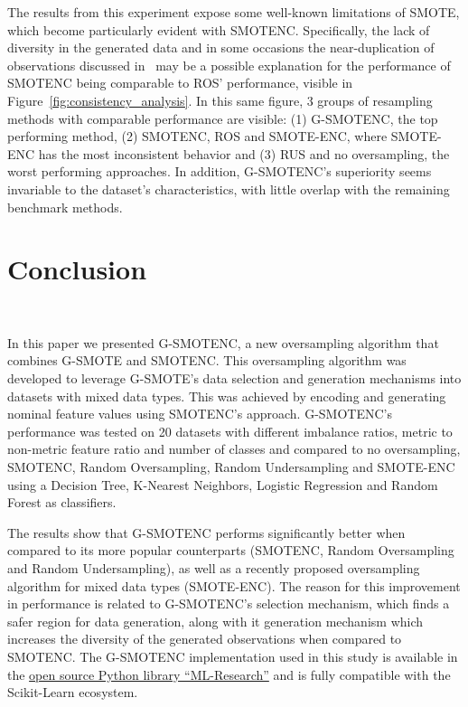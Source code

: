 \documentclass[parskip=full]{scrartcl}
\begin{document}
The results from this experiment expose some well-known limitations of SMOTE,
which become particularly evident with SMOTENC. Specifically, the lack of
diversity in the generated data and in some occasions the near-duplication of
observations discussed in~\cite{douzas2019geometric} may be a possible
explanation for the performance of SMOTENC being comparable to ROS'
performance, visible in Figure~\ref{fig:consistency_analysis}. In this same
figure, 3 groups of resampling methods with comparable performance are
visible: (1) G-SMOTENC, the top performing method, (2) SMOTENC, ROS and
SMOTE-ENC, where SMOTE-ENC has the most inconsistent behavior and (3) RUS and
no oversampling, the worst performing approaches. In addition, G-SMOTENC's
superiority seems invariable to the dataset's characteristics, with little
overlap with the remaining benchmark methods.

\section{Conclusion}~\label{sec:conclusion}

In this paper we presented G-SMOTENC, a new oversampling algorithm that
combines G-SMOTE and SMOTENC. This oversampling algorithm was developed to
leverage G-SMOTE's data selection and generation mechanisms into datasets with
mixed data types. This was achieved by encoding and generating nominal feature
values using SMOTENC's approach. G-SMOTENC's performance was tested on 20
datasets with different imbalance ratios, metric to non-metric feature ratio
and number of classes and compared to no oversampling, SMOTENC, Random
Oversampling, Random Undersampling and SMOTE-ENC using a Decision Tree,
K-Nearest Neighbors, Logistic Regression and Random Forest as classifiers.

The results show that G-SMOTENC performs significantly better when compared to
its more popular counterparts (SMOTENC, Random Oversampling and Random
Undersampling), as well as a recently proposed oversampling algorithm for
mixed data types (SMOTE-ENC). The reason for this improvement in performance
is related to G-SMOTENC's selection mechanism, which finds a safer region for
data generation, along with it generation mechanism which increases the
diversity of the generated observations when compared to SMOTENC. The
G-SMOTENC implementation used in this study is available in the
\href{https://github.com/joaopfonseca/ml-research}{open source Python library
``ML-Research''} and is fully compatible with the Scikit-Learn ecosystem.
\end{document}
